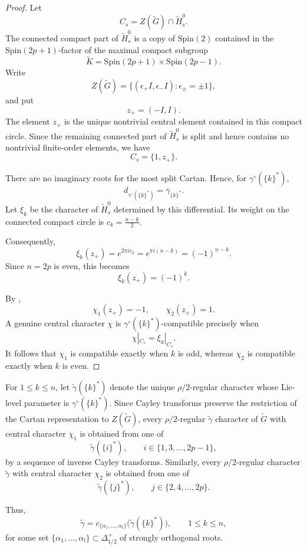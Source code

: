 \documentclass{amsart}
\newcommand{\Spin}{{\mathrm{Spin}}}
\theoremstyle{definition}
\newcommand{\tu}{\widetilde}
\begin{document}
\begin{proof}
Let
\[
C_s
=
Z(\widetilde G)\cap \widetilde H_s^0.
\]
The connected compact part of \(\widetilde H_s^0\) is a copy of
\(\Spin(2)\) contained in the \(\Spin(2p+1)\)-factor of the maximal
compact subgroup
\[
\widetilde K
=
\Spin(2p+1)\times\Spin(2p-1).
\]
Write
\[
Z(\widetilde G)
=
\{(\epsilon_+I,\epsilon_-I):\epsilon_\pm=\pm1\},
\]
and put
\[
z_+=(-I,I).
\]
The element \(z_+\) is the unique nontrivial central element contained
in this compact circle. Since the remaining connected part of
\(\widetilde H_s^0\) is split and hence contains no nontrivial
finite-order elements, we have
\[
C_s=\{1,z_+\}.
\]

There are no imaginary roots for the most split Cartan. Hence, for
\(\gamma^\circ(\{k\}^*)\),
\[
d_{\gamma^\circ(\{k\}^*)}
=
\overline\gamma_{\{k\}^*}.
\]
Let \(\xi_k\) be the character of \(\widetilde H_s^0\) determined by
this differential. Its weight on the connected compact circle is
$c_k=\displaystyle\frac{n-k}{2}.$

Consequently,
\[
\xi_k(z_+)
=
e^{2\pi i c_k}
=
e^{\pi i(n-k)}
=
(-1)^{n-k}.
\]
Since \(n=2p\) is even, this becomes
\[
\xi_k(z_+)=(-1)^k.
\]

By  \cite[Lemma 6.2]{BTs18},
\[
\chi_1(z_+)=-1,
\qquad
\chi_2(z_+)=1.
\]
A genuine central character \(\chi\) is
\(\gamma^\circ(\{k\}^*)\)-compatible precisely when
\[
\chi|_{C_s}=\xi_k|_{C_s}.
\]
It follows that \(\chi_1\) is compatible exactly when \(k\) is odd,
whereas \(\chi_2\) is compatible exactly when \(k\) is even.
\end{proof}

For \(1\leq k\leq n\), let
$\widetilde\gamma(\{k\}^*)$
denote the unique \(\rho/2\)-regular character whose Lie-level
parameter is \(\gamma^\circ(\{k\}^*)\).
Since Cayley transforms preserve the restriction of the Cartan
representation to \(Z(\widetilde G)\), every \(\rho/2\)-regular $\tu\gamma$
character of \(\widetilde G\) with central character \(\chi_1\) is
obtained from one of
\[
\widetilde\gamma(\{i\}^*),
\qquad
i\in\{1,3,\ldots,2p-1\},
\]
by a sequence of inverse Cayley transforms. Similarly, every
\(\rho/2\)-regular character  $\tu\gamma$  with central character \(\chi_2\) is
obtained from one of
\[
\widetilde\gamma(\{j\}^*),
\qquad
j\in\{2,4,\ldots,2p\}.
\]

Thus,
\[
\widetilde\gamma
=
c_{\{\alpha_1,\ldots,\alpha_l\}}
\bigl(\widetilde\gamma(\{k\}^*)\bigr),
\qquad 1\leq k\leq n,
\]
for some set
\(\{\alpha_1,\ldots,\alpha_l\}\subset\Delta_{1/2}^+\)
of strongly orthogonal roots.
\end{document}
